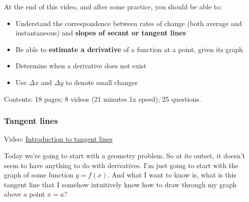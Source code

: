 \documentclass[pdftex, brazil, 12pt, twoside]{article}
\begin{document}
At the end of this video, and after some practice, you should be able to:

\begin{itemize}[noitemsep]
\item Understand the correspondence between rates of change (both average and
  instantaneous) and \textbf{slopes of secant or tangent lines}
\item Be able to \textbf{estimate a derivative} of a function at a point, given
  its graph
\item Determine when a derivative does not exist
\item Use $\Delta x$ and $\Delta y$ to denote small changes
\end{itemize}

Contents: 18 pages; 8 videos (21 minutes 1x speed); 25 questions.

\subsubsection{Tangent lines}
\label{u1-geometric-tangent-lines}

Video: \href{https://www.youtube.com/watch?v=XvuHw1a1F6o}{Introduction to tangent lines}

Today we're going to start with a geometry problem.
So at its outset, it doesn't seem to have anything
to do with derivatives.
I'm just going to start with the graph of some function $y=f(x)$.
And what I want to know is, what is this tangent line
that I somehow intuitively know how
to draw through my graph above a point $x = a$?

\begin{figure}[H]
  \begin{center}
  \end{center}
\end{figure}
\end{document}

